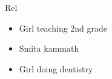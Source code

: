 \begin{frame}
\begin{columns}
\begin{column}{0.20\linewidth}
\begin{block}{Rel}
\begin{itemize}
\small \item Girl teaching 2nd grade 

  \item \small Smita kammath 

      \item \small Girl doing dentistry


  \end{itemize} 
\end{block} 
\end{column}%

\end{columns}

\end{frame}







